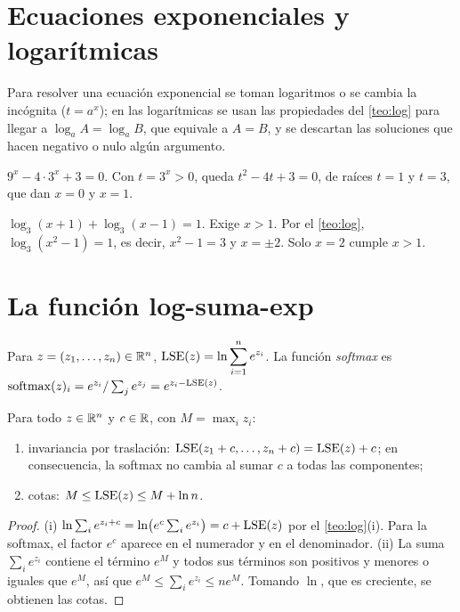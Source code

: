 \section{Ecuaciones exponenciales y logarítmicas}

Para resolver una ecuación exponencial se toman logaritmos o se cambia la incógnita ($t=a^x$); en las logarítmicas se usan las propiedades del \cref{teo:log} para llegar a $\log_aA=\log_aB$, que equivale a $A=B$, y se descartan las soluciones que hacen negativo o nulo algún argumento.

\begin{ejemplo}\label{ej:ecuacion-exp}
$9^x-4\cdot3^x+3=0$. Con $t=3^x>0$, queda $t^2-4t+3=0$, de raíces $t=1$ y $t=3$, que dan $x=0$ y $x=1$.
\end{ejemplo}

\begin{ejemplo}\label{ej:ecuacion-log}
$\log_3(x+1)+\log_3(x-1)=1$. Exige $x>1$. Por el \cref{teo:log}, $\log_3(x^2-1)=1$, es decir, $x^2-1=3$ y $x=\pm2$. Solo $x=2$ cumple $x>1$.
\end{ejemplo}

\section{La función log-suma-exp}

\begin{definicion}\label{def:lse}
Para $z=(z_1,\dots,z_n)\in\mathbb{R}^n$, $\displaystyle\operatorname{LSE}(z)=\ln\sum_{i=1}^ne^{z_i}$. La función \emph{softmax} es $\operatorname{softmax}(z)_i=e^{z_i}/\sum_je^{z_j}=e^{z_i-\operatorname{LSE}(z)}$.
\end{definicion}

\begin{proposicion}\label{prop:lse}
Para todo $z\in\mathbb{R}^n$ y $c\in\mathbb{R}$, con $M=\max_iz_i$:
\begin{enumerate}
  \item invariancia por traslación: $\operatorname{LSE}(z_1+c,\dots,z_n+c)=\operatorname{LSE}(z)+c$; en consecuencia, la softmax no cambia al sumar $c$ a todas las componentes;
  \item cotas: $M\le\operatorname{LSE}(z)\le M+\ln n$.
\end{enumerate}
\end{proposicion}

\begin{proof}
(i) $\ln\sum_ie^{z_i+c}=\ln\bigl(e^c\sum_ie^{z_i}\bigr)=c+\operatorname{LSE}(z)$ por el \cref{teo:log}(i). Para la softmax, el factor $e^c$ aparece en el numerador y en el denominador. (ii) La suma $\sum_ie^{z_i}$ contiene el término $e^M$ y todos sus términos son positivos y menores o iguales que $e^M$, así que $e^M\le\sum_ie^{z_i}\le ne^M$. Tomando $\ln$, que es creciente, se obtienen las cotas.
\end{proof}

